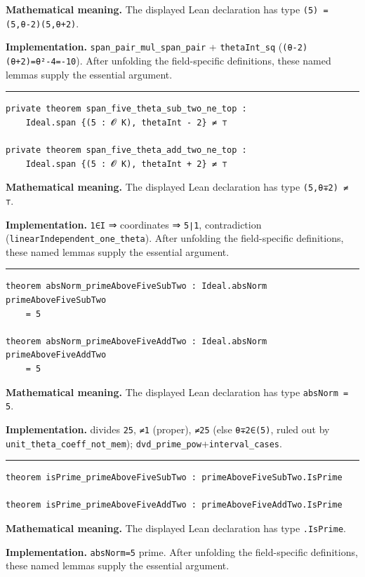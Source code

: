 \documentclass[UTF8,a4paper,11pt,fontset=fandol]{ctexart}
\theoremstyle{definition}
\newcommand{\statementsep}{\par\medskip\hrule\medskip}
\begin{document}
\noindent\textbf{Mathematical meaning.} The displayed Lean declaration has type \texttt{(5) = (5,θ-2)(5,θ+2)}.\par
\noindent\textbf{Implementation.} \texttt{span\_\allowbreak{}pair\_\allowbreak{}mul\_\allowbreak{}span\_\allowbreak{}pair} + \texttt{thetaInt\_\allowbreak{}sq} (\texttt{(θ-2)(θ+2)=θ²-4=-10}). After unfolding the field-specific definitions, these named lemmas supply the essential argument.\par
\statementsep
\begin{verbatim}
private theorem span_five_theta_sub_two_ne_top :
    Ideal.span {(5 : 𝓞 K), thetaInt - 2} ≠ ⊤

private theorem span_five_theta_add_two_ne_top :
    Ideal.span {(5 : 𝓞 K), thetaInt + 2} ≠ ⊤
\end{verbatim}
\noindent\textbf{Mathematical meaning.} The displayed Lean declaration has type \texttt{(5,θ∓2) ≠ ⊤}.\par
\noindent\textbf{Implementation.} \texttt{1∈I} ⇒ coordinates ⇒ \texttt{5∣1}, contradiction (\texttt{linearIndependent\_\allowbreak{}one\_\allowbreak{}theta}). After unfolding the field-specific definitions, these named lemmas supply the essential argument.\par
\statementsep
\begin{verbatim}
theorem absNorm_primeAboveFiveSubTwo : Ideal.absNorm primeAboveFiveSubTwo
    = 5

theorem absNorm_primeAboveFiveAddTwo : Ideal.absNorm primeAboveFiveAddTwo
    = 5
\end{verbatim}
\noindent\textbf{Mathematical meaning.} The displayed Lean declaration has type \texttt{absNorm = 5}.\par
\noindent\textbf{Implementation.} divides \texttt{25}, \texttt{≠1} (proper), \texttt{≠25} (else \texttt{θ∓2∈(5)}, ruled out by \texttt{unit\_\allowbreak{}theta\_\allowbreak{}coeff\_\allowbreak{}not\_\allowbreak{}mem}); \texttt{dvd\_\allowbreak{}prime\_\allowbreak{}pow}+\texttt{interval\_\allowbreak{}cases}.\par
\statementsep
\begin{verbatim}
theorem isPrime_primeAboveFiveSubTwo : primeAboveFiveSubTwo.IsPrime

theorem isPrime_primeAboveFiveAddTwo : primeAboveFiveAddTwo.IsPrime
\end{verbatim}
\noindent\textbf{Mathematical meaning.} The displayed Lean declaration has type \texttt{.\allowbreak{}IsPrime}.\par
\noindent\textbf{Implementation.} \texttt{absNorm=5} prime. After unfolding the field-specific definitions, these named lemmas supply the essential argument.\par
\end{document}
